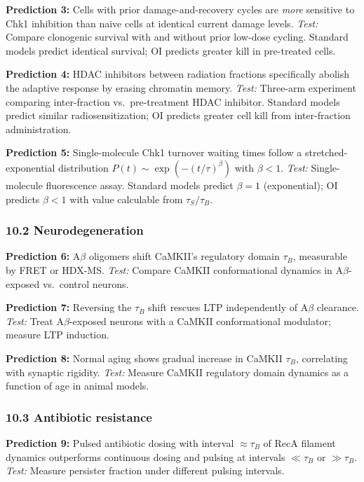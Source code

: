 \documentclass[
  11pt,
]{article}
\begin{document}
\textbf{Prediction 3:} Cells with prior damage-and-recovery cycles are
\emph{more} sensitive to Chk1 inhibition than naive cells at identical
current damage levels. \emph{Test:} Compare clonogenic survival with and
without prior low-dose cycling. Standard models predict identical
survival; OI predicts greater kill in pre-treated cells.

\textbf{Prediction 4:} HDAC inhibitors between radiation fractions
specifically abolish the adaptive response by erasing chromatin memory.
\emph{Test:} Three-arm experiment comparing inter-fraction
vs.~pre-treatment HDAC inhibitor. Standard models predict similar
radiosensitization; OI predicts greater cell kill from inter-fraction
administration.

\textbf{Prediction 5:} Single-molecule Chk1 turnover waiting times
follow a stretched-exponential distribution
\(P(t) \sim \exp(-(t/\tau)^\beta)\) with \(\beta < 1\). \emph{Test:}
Single-molecule fluorescence assay. Standard models predict
\(\beta = 1\) (exponential); OI predicts \(\beta < 1\) with value
calculable from \(\tau_S / \tau_B\).

\hypertarget{neurodegeneration-1}{%
\subsubsection{10.2 Neurodegeneration}\label{neurodegeneration-1}}

\textbf{Prediction 6:} A\(\beta\) oligomers shift CaMKII's regulatory
domain \(\tau_B\), measurable by FRET or HDX-MS. \emph{Test:} Compare
CaMKII conformational dynamics in A\(\beta\)-exposed vs.~control
neurons.

\textbf{Prediction 7:} Reversing the \(\tau_B\) shift rescues LTP
independently of A\(\beta\) clearance. \emph{Test:} Treat
A\(\beta\)-exposed neurons with a CaMKII conformational modulator;
measure LTP induction.

\textbf{Prediction 8:} Normal aging shows gradual increase in CaMKII
\(\tau_B\), correlating with synaptic rigidity. \emph{Test:} Measure
CaMKII regulatory domain dynamics as a function of age in animal models.

\hypertarget{antibiotic-resistance-1}{%
\subsubsection{10.3 Antibiotic
resistance}\label{antibiotic-resistance-1}}

\textbf{Prediction 9:} Pulsed antibiotic dosing with interval
\(\approx \tau_B\) of RecA filament dynamics outperforms continuous
dosing and pulsing at intervals \(\ll \tau_B\) or \(\gg \tau_B\).
\emph{Test:} Measure persister fraction under different pulsing
intervals.
\end{document}

